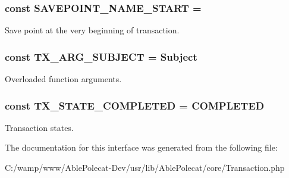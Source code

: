 \subsubsection[{S\+A\+V\+E\+P\+O\+I\+N\+T\+\_\+\+N\+A\+M\+E\+\_\+\+S\+T\+A\+R\+T}]{\setlength{\rightskip}{0pt plus 5cm}const S\+A\+V\+E\+P\+O\+I\+N\+T\+\_\+\+N\+A\+M\+E\+\_\+\+S\+T\+A\+R\+T = \textquotesingle{}}\label{interface_able_polecat___transaction_interface_a04ed49890eb8b5b01df737c511037773}
Save point at the very beginning of transaction. \hypertarget{interface_able_polecat___transaction_interface_a726c4c2c8870ed3d97a4a758df3486fe}{}
\subsubsection[{T\+X\+\_\+\+A\+R\+G\+\_\+\+S\+U\+B\+J\+E\+C\+T}]{\setlength{\rightskip}{0pt plus 5cm}const T\+X\+\_\+\+A\+R\+G\+\_\+\+S\+U\+B\+J\+E\+C\+T = \textquotesingle{}Subject\textquotesingle{}}\label{interface_able_polecat___transaction_interface_a726c4c2c8870ed3d97a4a758df3486fe}
Overloaded function arguments. \hypertarget{interface_able_polecat___transaction_interface_abcfd87c8ccec5768bde1a9c8452d9c7f}{}
\subsubsection[{T\+X\+\_\+\+S\+T\+A\+T\+E\+\_\+\+C\+O\+M\+P\+L\+E\+T\+E\+D}]{\setlength{\rightskip}{0pt plus 5cm}const T\+X\+\_\+\+S\+T\+A\+T\+E\+\_\+\+C\+O\+M\+P\+L\+E\+T\+E\+D = \textquotesingle{}C\+O\+M\+P\+L\+E\+T\+E\+D\textquotesingle{}}\label{interface_able_polecat___transaction_interface_abcfd87c8ccec5768bde1a9c8452d9c7f}
Transaction states. 

The documentation for this interface was generated from the following file\+:\begin{DoxyCompactItemize}
\item 
C\+:/wamp/www/\+Able\+Polecat-\/\+Dev/usr/lib/\+Able\+Polecat/core/Transaction.\+php\end{DoxyCompactItemize}
